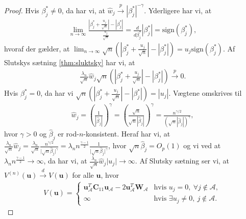 \begin{proof}
Hvis $\beta_j^{*} \neq 0$, da har vi, at $\hat{w}_j \overset{p}{\rightarrow} \left\vert \beta_j^{*} \right\vert^{-\gamma}$. Yderligere har vi, at 
\begin{align*}
\lim_{n\rightarrow \infty}
\frac{\left\vert \beta_j^{*} +\frac{u_j}{\sqrt{n}} \right\vert - \left\vert \beta_j^{*} \right\vert}{\frac{u_j}{\sqrt{n}}} =\frac{d}{d \beta_j^{*}} \left\vert \beta_j^{*} \right\vert =\text{sign}\left(\beta_j^{*} \right),
\end{align*} 
hvoraf der gælder, at $\lim_{n\rightarrow \infty} \sqrt{n} \left( \left\vert \beta_j^{*} +\frac{u_j}{\sqrt{n}} \right\vert - \left\vert \beta_j^{*} \right\vert \right) = u_j \text{sign}\left(\beta_j^{*} \right)$.
Af Slutskys sætning \ref{thm:sluktsky} har vi, at 
\begin{align*}
\frac{ \lambda_n}{\sqrt{n}} \hat{w}_j \sqrt{n} \left(\left\vert \beta_j^{*} +\frac{u_j}{\sqrt{n}} \right\vert - \left\vert \beta_j^{*} \right\vert \right) \overset{p}{\rightarrow} 0.
\end{align*}
Hvis $\beta_j^{*} = 0$, da har vi $\sqrt{n} \left( \left\vert \beta_j^{*} +\frac{u_j}{\sqrt{n}} \right\vert - \left\vert \beta_j^{*} \right\vert \right) = \left\vert u_j \right\vert$.
Vægtene omskrives til
\begin{align*}
\hat{w}_j= \left( \frac{1}{\left\vert \hat{\beta}_j \right\vert} \right)^\gamma=\left( \frac{\sqrt{n}}{\sqrt{n} \left\vert \hat{\beta}_j \right\vert} \right)^\gamma = \frac{n^{\gamma/2}}{ \left( \sqrt{n} \left\vert \hat{\beta}_j \right\vert \right)^\gamma},
\end{align*} 
hvor $\gamma >0$ og $\hat{\beta}_j$ er rod-$n$-konsistent. Heraf har vi, at $\frac{\lambda_n}{\sqrt{n}} \hat{w}_j = \frac{\lambda_n}{\sqrt{n}} \frac{n^{\gamma/2}}{\vert \sqrt{n} \hat{\beta}_j \vert^\gamma} = \lambda_n n^{\frac{\gamma -1}{2}} \frac{1}{\vert \sqrt{n} \hat{\beta}_j \vert^\gamma} $, hvor $\sqrt{n} \hat{\beta}_j = O_p(1)$ og vi ved at  $\lambda_n n^\frac{\gamma-1}{2} \rightarrow \infty$, da har vi, at $\frac{\lambda_n}{\sqrt{n}} \hat{w}_j  \vert u_j \vert \rightarrow \infty$.
Af Slutsky sætning ser vi, at $V^{(n)} (\mathbf{u}) \overset{d}{\rightarrow} V(\textbf{u})$ for alle $\mathbf{u}$, hvor
\begin{align*}
V(\textbf{u}) = \begin{cases}
    \mathbf{u}_\mathcal{A}^T \mathbf{C}_{11} \mathbf{u}_\mathcal{A}-2\mathbf{u}^T_\mathcal{A} \mathbf{W}_\mathcal{A} & \text{hvis  $u_j=0, \ \forall j \notin \mathcal{A} $},\\
    \infty & \text{hvis } \exists u_j \neq 0, \ j \notin \mathcal{A} .

\end{cases}
\end{align*}
\end{proof}
